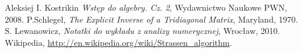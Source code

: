 \begin{thebibliography}{99}
 Aleksiej I. Kostrikin {\it Wstęp do algebry. Cz. 2}, Wydawnictwo Naukowe PWN, 2008.
 P.Schlegel, {\it The Explicit Inverse of a Tridiagonal Matrix}, Maryland, 1970.
   S. Lewanowicz, {\it Notatki do wykładu z analizy numerycznej}, Wrocław, 2010.
 Wikipedia, \url{http://en.wikipedia.org/wiki/Strassen_algorithm}.
\end{thebibliography}

